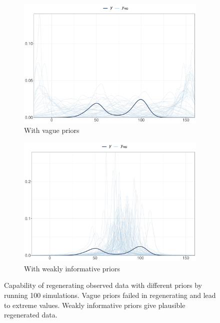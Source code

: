 \documentclass[a4paper]{article}   	%
\begin{document}
	\begin{figure}[!htp]
		\centering
		\begin{subfigure}[t]{0.45\textwidth}
			\centering
			\includegraphics[width=\linewidth]{Images/priorcheck_vague}
			\caption{With vague priors}
		\end{subfigure}
		\space
		\begin{subfigure}[t]{0.45\textwidth}
			\centering
			\includegraphics[width=\linewidth]{Images/priorcheck_weak}
			\caption{With weakly informative priors}
		\end{subfigure}
		\caption{Capability of regenerating observed data with different priors by running 100 simulations. Vague priors failed in regenerating and lead to extreme values. Weakly informative priors give plausible regenerated data. }\label{fig:priorcheck}
	\end{figure}
	
\end{document}
